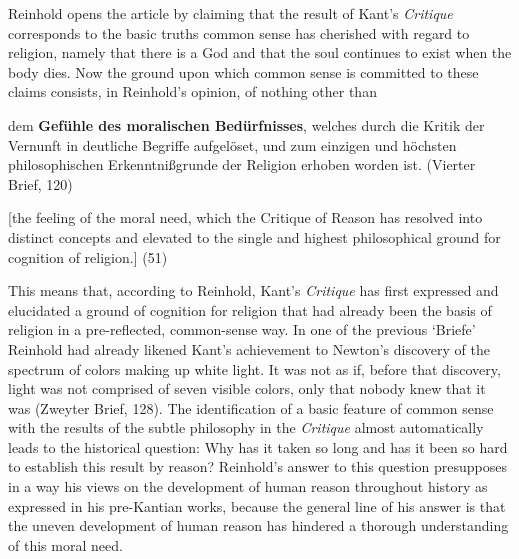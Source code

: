  Reinhold opens the article by claiming that the result of Kant's \textit{Critique} corresponds to the basic truths common sense has cherished with regard to religion, namely that there is a God and that the soul continues to exist when the body dies. Now the ground upon which common sense is committed to these claims consists, in Reinhold's opinion, of nothing other than 

dem \textbf{Gef\"{u}hle des moralischen Bed\"{u}rfnisses}, welches durch die Kritik der Vernunft in deutliche Begriffe aufgel\"{o}set, und zum einzigen und h\"{o}chsten philosophischen Erkenntni\ss{}grunde der Religion erhoben worden ist. (Vierter Brief, 120)

[the feeling of the moral need, which the Critique of Reason has resolved into distinct concepts and elevated to the single and highest philosophical ground for cognition of religion.] (51)

This means that, according to Reinhold, Kant's \textit{Critique} has first expressed and elucidated a ground of cognition for religion that had already been the basis of religion in a pre{-}reflected, common{-}sense way. In one of the previous `Briefe' Reinhold had already likened Kant's achievement to Newton's discovery of the spectrum of colors making up white light. It was not as if, before that discovery, light was not comprised of seven visible colors, only that nobody knew that it was (Zweyter Brief, 128). The identification of a basic feature of common sense with the results of the subtle philosophy in the \textit{Critique} almost automatically leads to the historical question: Why has it taken so long and has it been so hard to establish this result by reason? Reinhold's answer to this question presupposes in a way his views on the development of human reason throughout history as expressed in his pre{-}Kantian works, because the general line of his answer is that the uneven development of human reason has hindered a thorough understanding of this moral need. 

